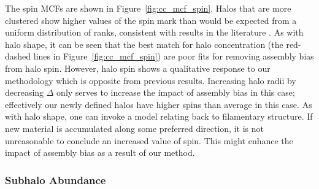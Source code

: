 \documentclass[usenatbib,fleqn]{mnras}
\begin{document}
The spin MCFs are shown in Figure~\ref{fig:cc_mcf_spin}. Halos that are more clustered show higher values of the spin mark than would be expected from a uniform distribution of ranks, consistent with results in the literature \citep{bett_etal07,faltenbacher_white10,lacerna_padilla12}. As with halo shape, it can be seen that the best match for halo concentration (the red-dashed lines in Figure~\ref{fig:cc_mcf_spin}) are poor fits for removing assembly bias from halo spin.
 However, halo spin shows a qualitative response to our methodology which is opposite from previous results. Increasing halo radii by decreasing $\Delta$ only serves to increase the impact of assembly bias in this case; effectively our newly defined halos have higher spins than average in this case. As with halo shape, one can invoke a model relating back to filamentary structure. If new material is accumulated along some preferred direction, it is not unreasonable to conclude an increased value of spin. This might enhance the impact of assembly bias as a result of our method.

\subsubsection{Subhalo Abundance}
\end{document}
